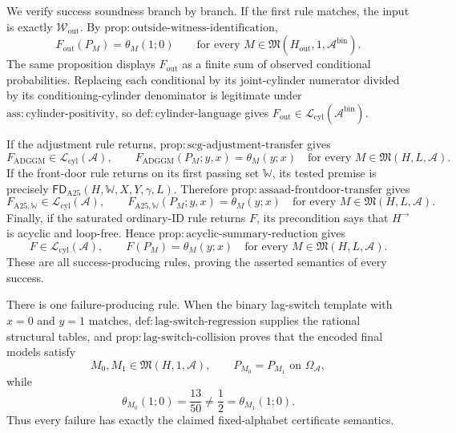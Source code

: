We verify success soundness branch by branch.  If the first rule matches, the input is exactly \(\mathcal W_{\mathrm{out}}\).  By \(\mathrm{prop:outside\text{-}witness\text{-}identification}\),
\[
 F_{\mathrm{out}}(P_M)=\theta_M(1;0)
 \qquad\text{for every }M\in\mathfrak M(H_{\mathrm{out}},1,\mathcal A^{\mathrm{bin}}).
\]
The same proposition displays \(F_{\mathrm{out}}\) as a finite sum of observed conditional probabilities.  Replacing each conditional by its joint-cylinder numerator divided by its conditioning-cylinder denominator is legitimate under \(\mathrm{ass:cylinder\text{-}positivity}\), so \(\mathrm{def:cylinder\text{-}language}\) gives \(F_{\mathrm{out}}\in\mathcal L_{\mathrm{cyl}}(\mathcal A^{\mathrm{bin}})\).

If the adjustment rule returns, \(\mathrm{prop:scg\text{-}adjustment\text{-}transfer}\) gives
\[
 F_{\mathrm{ADGGM}}\in\mathcal L_{\mathrm{cyl}}(\mathcal A),
 \qquad
 F_{\mathrm{ADGGM}}(P_M;y,x)=\theta_M(y;x)
 \quad\text{for every }M\in\mathfrak M(H,L,\mathcal A).
\]
If the front-door rule returns on its first passing set \(\mathbb W\), its tested premise is precisely \(\mathsf{FD}_{\mathrm{A25}}(H,\mathbb W,X,Y,\gamma,L)\).  Therefore \(\mathrm{prop:assaad\text{-}frontdoor\text{-}transfer}\) gives
\[
 F_{\mathrm{A25},\mathbb W}\in\mathcal L_{\mathrm{cyl}}(\mathcal A),
 \qquad
 F_{\mathrm{A25},\mathbb W}(P_M;y,x)=\theta_M(y;x)
 \quad\text{for every }M\in\mathfrak M(H,L,\mathcal A).
\]
Finally, if the saturated ordinary-ID rule returns \(F\), its precondition says that \(H^{\to}\) is acyclic and loop-free.  Hence \(\mathrm{prop:acyclic\text{-}summary\text{-}reduction}\) gives
\[
 F\in\mathcal L_{\mathrm{cyl}}(\mathcal A),
 \qquad
 F(P_M)=\theta_M(y;x)
 \quad\text{for every }M\in\mathfrak M(H,L,\mathcal A).
\]
These are all success-producing rules, proving the asserted semantics of every success.

There is one failure-producing rule.  When the binary lag-switch template with \(x=0\) and \(y=1\) matches, \(\mathrm{def:lag\text{-}switch\text{-}regression}\) supplies the rational structural tables, and \(\mathrm{prop:lag\text{-}switch\text{-}collision}\) proves that the encoded final models satisfy
\[
 M_0,M_1\in\mathfrak M(H,1,\mathcal A),\qquad
 P_{M_0}=P_{M_1}\text{ on }\Omega_{\mathcal A},
\]
while
\[
 \theta_{M_0}(1;0)=\frac{13}{50}\ne\frac12=\theta_{M_1}(1;0).
\]
Thus every failure has exactly the claimed fixed-alphabet certificate semantics.

